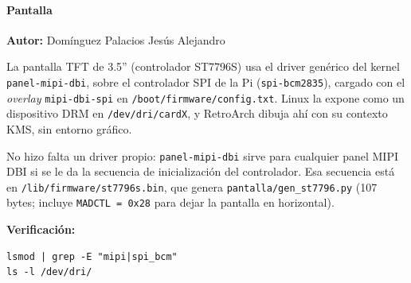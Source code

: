 \paragraph{Pantalla}
\textbf{Autor:} Domínguez Palacios Jesús Alejandro

La pantalla TFT de 3.5'' (controlador ST7796S) usa el driver genérico del kernel \texttt{panel-mipi-dbi}, sobre el
controlador SPI de la Pi (\texttt{spi-bcm2835}), cargado con el \textit{overlay} \texttt{mipi-dbi-spi} en
\texttt{/boot/firmware/config.txt}. Linux la expone como un dispositivo DRM en \texttt{/dev/dri/cardX}, y
RetroArch dibuja ahí con su contexto KMS, sin entorno gráfico.

No hizo falta un driver propio: \texttt{panel-mipi-dbi} sirve para cualquier panel MIPI DBI si se le da la secuencia de
inicialización del controlador. Esa secuencia está en \texttt{/lib/firmware/st7796s.bin}, que genera
\texttt{pantalla/gen\_st7796.py} (107 bytes; incluye \texttt{MADCTL = 0x28} para dejar la pantalla en horizontal).

\textbf{Verificación:}
\begin{lstlisting}
lsmod | grep -E "mipi|spi_bcm"
ls -l /dev/dri/
\end{lstlisting}
